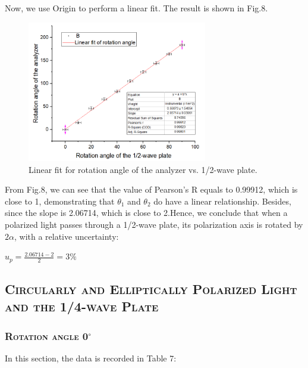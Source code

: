 \documentclass[a4paper,12pt]{article}
\begin{document}
\newpage
Now, we use Origin to perform a linear fit. The result is shown in Fig.8.
\begin{figure}[h] 
    \centering
    \includegraphics[width=0.7\textwidth]{R2} 
    \caption{Linear fit for rotation angle of the analyzer vs. 1/2-wave plate.} 
\end{figure}

From Fig.8, we can see that the value of Pearson's R equals to 0.99912, which is close to 1, demonstrating that $\theta_1$ and $\theta_2$ do have a linear relationship. Besides, since the slope is 2.06714, which is close to 2.Hence, we conclude that when a polarized light passes through a 1/2-wave plate, its polarization axis is rotated by $2\alpha$, with a relative uncertainty:
\begin{center}
$\displaystyle u_p = \frac{2.06714-2}{2} = 3\%$
\end{center}

\subsection{\textsc{Circularly and Elliptically Polarized Light and the 1/4-wave Plate}}
\subsubsection{\textsc{Rotation angle 0$^\circ$}}
In this section, the data is recorded in Table 7:
\end{document}
